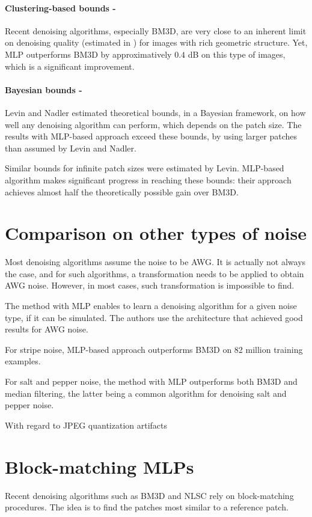 \documentclass[10pt,a4paper]{article}
\newcommand{\svs}{\vspace{9pt}}
\newcommand{\ourparagraph}[1]{\paragraph{#1}}
\begin{document}
\ourparagraph{Clustering-based bounds -}{Recent denoising algorithms, especially BM3D, are very close to an inherent limit on denoising quality (estimated in \citep{deaddenoise}) for images with rich geometric structure. Yet, MLP outperforms BM3D by approximatively $0.4$ dB on this type of images, which is a significant improvement.

\svs

\ourparagraph{Bayesian bounds -}{Levin and Nadler \citep{Levin2011NaturalID} estimated theoretical bounds, in a Bayesian framework, on how well any denoising algorithm can perform, which depends on the patch size. The results with MLP-based approach exceed these bounds, by using larger patches than assumed by Levin and Nadler.

Similar bounds for infinite patch sizes were estimated by Levin. MLP-based algorithm makes significant progress in reaching these bounds: their approach achieves almost half the theoretically possible gain over BM3D.}

\section{Comparison on other types of noise}

Most denoising algorithms assume the noise to be AWG. It is actually not always the case, and for such algorithms, a transformation needs to be applied to obtain AWG noise. However, in most cases, such transformation is impossible to find.

The method with MLP enables to learn a denoising algorithm for a given noise type, if it can be simulated. The authors use the architecture that achieved good results for AWG noise.

For stripe noise, MLP-based approach outperforms BM3D on 82 million training examples.

For salt and pepper noise, the method with MLP outperforms both BM3D and median filtering, the latter being a common algorithm for denoising salt and pepper noise.

With regard to JPEG quantization artifacts


\section{Block-matching MLPs}

Recent denoising algorithms such as BM3D and NLSC rely on block-matching procedures. The idea is to find the patches most similar to a reference patch.

}
\end{document}
